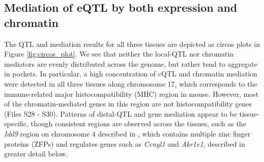 \documentclass[9pt,twocolumn,twoside]{gsajnl}
\begin{document}
\subsection{Mediation of eQTL by both expression and chromatin}
The QTL and mediation results for all three tissues are depicted as circos plots \citep{Gu2014} in Figure \ref{fig:circos_plot}. We see that neither the local-QTL nor chromatin mediators are evenly distributed across the genome, but rather tend to aggregate in pockets. In particular, a high concentration of cQTL and chromatin mediation were detected in all three tissues along chromosome 17, which corresponds to the immune-related major histocompatibility (MHC) region in mouse. However, most of the chromatin-mediated genes in this region are not histocompatibility genes (Files S28 - S30). Patterns of distal-QTL and gene mediation appear to be tissue-specific, though consistent regions are observed across the tissues, such as the \textit{Idd9} region on chromosome 4 described in \cite{HamiltonWilliams2010}, which contains multiple zinc finger proteins (ZFPs) and regulates genes such as \textit{Ccnyl1} and \textit{Akr1e1}, described in greater detail below.
\end{document}
